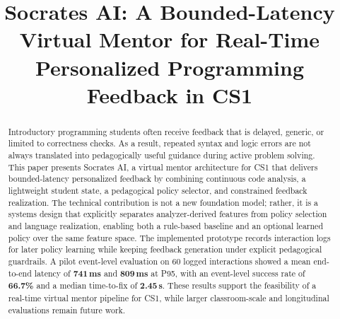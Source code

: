 ﻿\documentclass[conference]{IEEEtran}
\newcommand{\system}{Socrates AI}
\begin{document}
\title{\system: A Bounded-Latency Virtual Mentor for Real-Time Personalized Programming Feedback in CS1}

\author{
    \and
}

\maketitle

\begin{abstract}
Introductory programming students often receive feedback that is delayed, generic, or limited to correctness checks. As a result, repeated syntax and logic errors are not always translated into pedagogically useful guidance during active problem solving. This paper presents \system, a virtual mentor architecture for CS1 that delivers bounded-latency personalized feedback by combining continuous code analysis, a lightweight student state, a pedagogical policy selector, and constrained feedback realization. The technical contribution is not a new foundation model; rather, it is a systems design that explicitly separates analyzer-derived features from policy selection and language realization, enabling both a rule-based baseline and an optional learned policy over the same feature space. The implemented prototype records interaction logs for later policy learning while keeping feedback generation under explicit pedagogical guardrails. A pilot event-level evaluation on 60 logged interactions showed a mean end-to-end latency of \textbf{741\,ms} and \textbf{809\,ms} at P95, with an event-level success rate of \textbf{66.7\%} and a median time-to-fix of \textbf{2.45\,s}. These results support the feasibility of a real-time virtual mentor pipeline for CS1, while larger classroom-scale and longitudinal evaluations remain future work.
\end{abstract}
\end{document}

